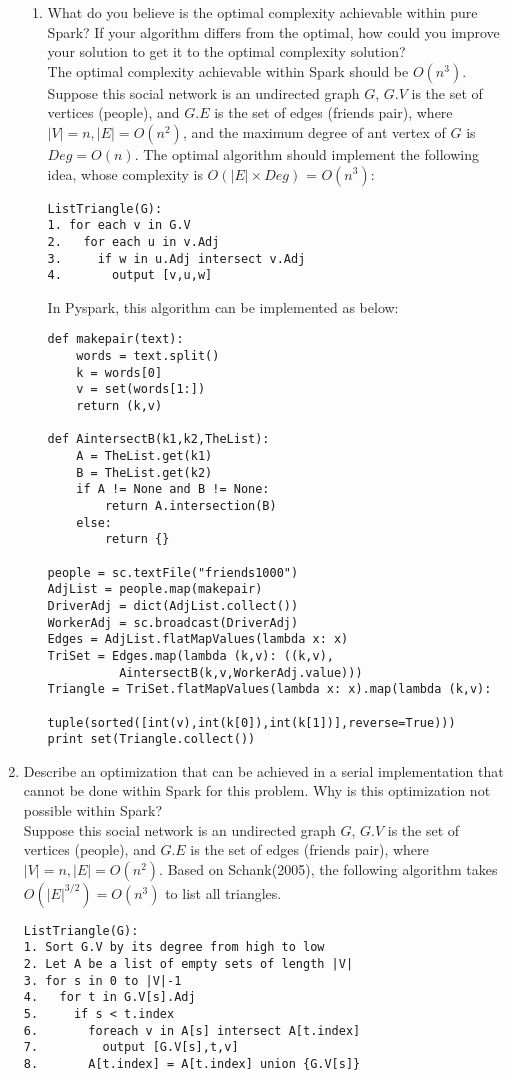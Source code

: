 \documentclass[11 pt, a4paper]{article}  %
\begin{document}
\begin{enumerate}
\begin{enumerate}
\item What do you believe is the optimal complexity achievable within pure Spark? If your algorithm differs from the optimal, how could you improve your solution to get it to the optimal complexity solution?\\

The optimal complexity achievable within Spark should be $O(n^3)$. Suppose this social network is an undirected graph $G$, $G.V$ is the set of vertices (people), and $G.E$ is the set of edges (friends pair), where $|V| = n, |E| = O(n^2)$, and the maximum degree of ant vertex of $G$ is $Deg = O(n)$. The optimal algorithm should implement the following idea, whose complexity is $O(|E|\times Deg)$ = $O(n^3)$:
\begin{verbatim}
ListTriangle(G):
1. for each v in G.V
2.   for each u in v.Adj
3.     if w in u.Adj intersect v.Adj
4.       output [v,u,w]
\end{verbatim}

In Pyspark, this algorithm can be implemented as below:
\begin{verbatim}
def makepair(text):
    words = text.split()
    k = words[0]
    v = set(words[1:])
    return (k,v)

def AintersectB(k1,k2,TheList):
    A = TheList.get(k1)
    B = TheList.get(k2)
    if A != None and B != None:
        return A.intersection(B)
    else:
        return {}

people = sc.textFile("friends1000")
AdjList = people.map(makepair)
DriverAdj = dict(AdjList.collect())
WorkerAdj = sc.broadcast(DriverAdj)
Edges = AdjList.flatMapValues(lambda x: x)
TriSet = Edges.map(lambda (k,v): ((k,v),  
          AintersectB(k,v,WorkerAdj.value)))
Triangle = TriSet.flatMapValues(lambda x: x).map(lambda (k,v): 
          tuple(sorted([int(v),int(k[0]),int(k[1])],reverse=True)))
print set(Triangle.collect())
\end{verbatim}

\end{enumerate}


\newpage
\item Describe an optimization that can be achieved in a serial implementation that cannot be done within Spark for this problem. Why is this optimization not possible within Spark?\\

Suppose this social network is an undirected graph $G$, $G.V$ is the set of vertices (people), and $G.E$ is the set of edges (friends pair), where $|V| = n, |E| = O(n^2)$. Based on Schank(2005), the following algorithm takes $O(|E|^{3/2}) = O(n^3)$ to list all triangles.
\begin{verbatim}
ListTriangle(G):
1. Sort G.V by its degree from high to low
2. Let A be a list of empty sets of length |V|
3. for s in 0 to |V|-1
4.   for t in G.V[s].Adj
5.     if s < t.index
6.       foreach v in A[s] intersect A[t.index]
7.         output [G.V[s],t,v]
8.       A[t.index] = A[t.index] union {G.V[s]}
\end{verbatim}


\end{enumerate}
\end{document}
